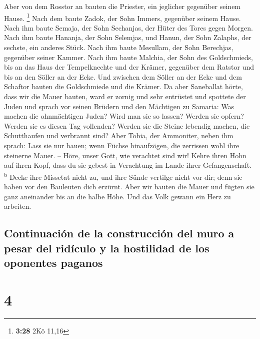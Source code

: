  Aber von dem Rosstor an bauten die Priester, ein
jeglicher gegenüber seinem Hause. \footnote{\textbf{3:28} 2Kö 11,16}
 Nach dem baute Zadok, der Sohn Immers, gegenüber seinem
Hause. Nach ihm baute Semaja, der Sohn Sechanjas, der Hüter des Tores
gegen Morgen.  Nach ihm baute Hananja, der Sohn Selemjas,
und Hanun, der Sohn Zalaphs, der sechste, ein anderes Stück. Nach ihm
baute Mesullam, der Sohn Berechjas, gegenüber seiner Kammer.
 Nach ihm baute Malchia, der Sohn des Goldschmieds, bis
an das Haus der Tempelknechte und der Krämer, gegenüber dem Ratstor und
bis an den Söller an der Ecke.  Und zwischen dem Söller
an der Ecke und dem Schaftor bauten die Goldschmiede und die Krämer.
 Da aber Saneballat hörte, dass wir die Mauer bauten,
ward er zornig und sehr entrüstet und spottete der Juden 
und sprach vor seinen Brüdern und den Mächtigen zu Samaria: Was machen
die ohnmächtigen Juden? Wird man sie so lassen? Werden sie opfern?
Werden sie es diesen Tag vollenden? Werden sie die Steine lebendig
machen, die Schutthaufen und verbrannt sind?  Aber Tobia,
der Ammoniter, neben ihm sprach: Lass sie nur bauen; wenn Füchse
hinaufzögen, die zerrissen wohl ihre steinerne Mauer. -- 
Höre, unser Gott, wie verachtet sind wir! Kehre ihren Hohn auf ihren
Kopf, dass du sie gebest in Verachtung im Lande ihrer Gefangenschaft.
\textsuperscript{b}  Decke ihre Missetat nicht zu, und
ihre Sünde vertilge nicht vor dir; denn sie haben vor den Bauleuten dich
erzürnt.  Aber wir bauten die Mauer und fügten sie ganz
aneinander bis an die halbe Höhe. Und das Volk gewann ein Herz zu
arbeiten.

\hypertarget{continuaciuxf3n-de-la-construcciuxf3n-del-muro-a-pesar-del-riduxedculo-y-la-hostilidad-de-los-oponentes-paganos}{%
\subsection{Continuación de la construcción del muro a pesar del
ridículo y la hostilidad de los oponentes
paganos}\label{continuaciuxf3n-de-la-construcciuxf3n-del-muro-a-pesar-del-riduxedculo-y-la-hostilidad-de-los-oponentes-paganos}}

\hypertarget{section-3}{%
\section{4}\label{section-3}}

